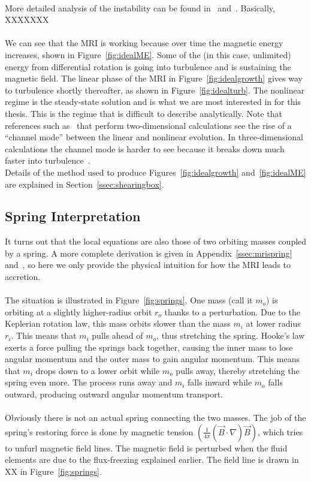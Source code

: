 \\
More detailed analysis of the instability can be found in~\citet{HB1} and~\citet{BH1998}. Basically, XXXXXXX\\
\\
We can see that the MRI is working because over time the magnetic energy increases, shown in Figure~\ref{fig:idealME}. Some of the (in this case, unlimited) energy from differential rotation is going into turbulence and is sustaining the magnetic field. The linear phase of the MRI in Figure~\ref{fig:idealgrowth} gives way to turbulence shortly thereafter, as shown in Figure~\ref{fig:idealturb}. The nonlinear regime is the steady-state solution and is what we are most interested in for this thesis. This is the regime that is difficult to describe analytically. Note that references such as~\citet{HB1} that perform two-dimensional calculations see the rise of a ``channel mode'' between the linear and nonlinear evolution. In three-dimensional calculations the channel mode is harder to see because it breaks down much faster into turbulence~\cite{hgb}.
\\
Details of the method used to produce Figures~\ref{fig:idealgrowth} and~\ref{fig:idealME} are explained in Section~\ref{ssec:shearingbox}.

\subsection{Spring Interpretation}
It turns out that the local equations are also those of two orbiting masses coupled by a spring. A more complete derivation is given in Appendix~\ref{ssec:mrispring} and~\citet{BH1998}, so here we only provide the physical intuition for how the MRI leads to accretion. \\
\\
The situation is illustrated in Figure~\ref{fig:springs}. One mass (call it $m_o$) is orbiting at a slightly higher-radius orbit $r_o$ thanks to a perturbation. Due to the Keplerian rotation law, this mass orbits slower than the mass $m_i$ at lower radius $r_i$. This means that $m_i$ pulls ahead of $m_o$, thus stretching the spring. Hooke's law exerts a force pulling the springs back together, causing the inner mass to lose angular momentum and the outer mass to gain angular momentum. This means that $m_i$ drops down to a lower orbit while $m_o$ pulls away, thereby stretching the spring even more. The process runs away and $m_i$ falls inward while $m_o$ falls outward, producing outward angular momentum transport. \\
\\
Obviously there is not an actual spring connecting the two masses. The job of the spring's restoring force is done by magnetic tension $\left(\frac{1}{4\pi}(\vec B\cdot\nabla)\vec B\right)$, which tries to unfurl magnetic field lines. The magnetic field is perturbed when the fluid elements are due to the flux-freezing explained earlier. The field line is drawn in XX in Figure~\ref{fig:springs}.


